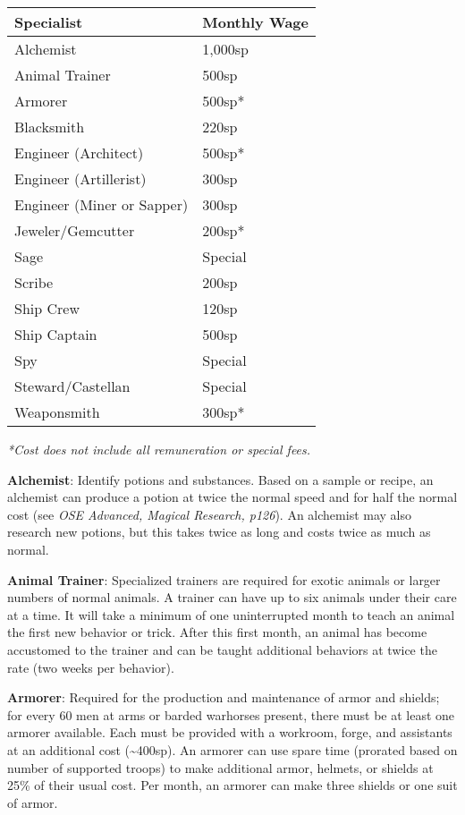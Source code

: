 \documentclass{article}
\begin{document}
\begin{multicols}{2}
\begin{longtable}[]{@{}ll@{}}
\toprule\noalign{}
Specialist & Monthly Wage \\
\midrule\noalign{}
\endhead
\bottomrule\noalign{}
\endlastfoot
Alchemist & 1,000sp \\
Animal Trainer & 500sp \\
Armorer & 500sp* \\
Blacksmith & 220sp \\
Engineer (Architect) & 500sp* \\
Engineer (Artillerist) & 300sp \\
Engineer (Miner or Sapper) & 300sp \\
Jeweler/Gemcutter & 200sp* \\
Sage & Special \\
Scribe & 200sp \\
Ship Crew & 120sp \\
Ship Captain & 500sp \\
Spy & Special \\
Steward/Castellan & Special \\
Weaponsmith & 300sp* \\
\end{longtable}

\emph{*Cost does not include all remuneration or special fees.}

\textbf{Alchemist}: Identify potions and substances. Based on a sample
or recipe, an alchemist can produce a potion at twice the normal speed
and for half the normal cost (see \emph{OSE Advanced, Magical Research,
p126}). An alchemist may also research new potions, but this takes twice
as long and costs twice as much as normal.

\textbf{Animal Trainer}: Specialized trainers are required for exotic
animals or larger numbers of normal animals. A trainer can have up to
six animals under their care at a time. It will take a minimum of one
uninterrupted month to teach an animal the first new behavior or trick.
After this first month, an animal has become accustomed to the trainer
and can be taught additional behaviors at twice the rate (two weeks per
behavior).

\textbf{Armorer}: Required for the production and maintenance of armor
and shields; for every 60 men at arms or barded warhorses present, there
must be at least one armorer available. Each must be provided with a
workroom, forge, and assistants at an additional cost
(\textasciitilde400sp). An armorer can use spare time (prorated based on
number of supported troops) to make additional armor, helmets, or
shields at 25\% of their usual cost. Per month, an armorer can make
three shields or one suit of armor.


\end{multicols}
\end{document}
